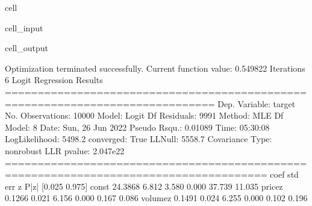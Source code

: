 \documentclass[letterpaper,10pt,english]{jupyterBook}
\begin{document}
\begin{sphinxuseclass}{cell}
\begin{sphinxVerbatimInput}
\begin{sphinxuseclass}{cell_input}
\end{sphinxuseclass}\end{sphinxVerbatimInput}
\begin{sphinxVerbatimOutput}

\begin{sphinxuseclass}{cell_output}
\begin{sphinxVerbatim}[commandchars=\\\{\}]
Optimization terminated successfully.
         Current function value: 0.549822
         Iterations 6
                           Logit Regression Results                           
==============================================================================
Dep. Variable:                 target   No. Observations:                10000
Model:                          Logit   Df Residuals:                     9991
Method:                           MLE   Df Model:                            8
Date:                Sun, 26 Jun 2022   Pseudo R\PYGZhy{}squ.:                 0.01089
Time:                        05:30:08   Log\PYGZhy{}Likelihood:                \PYGZhy{}5498.2
converged:                       True   LL\PYGZhy{}Null:                       \PYGZhy{}5558.7
Covariance Type:            nonrobust   LLR p\PYGZhy{}value:                 2.047e\PYGZhy{}22
======================================================================================
                         coef    std err          z      P\PYGZgt{}|z|      [0.025      0.975]
\PYGZhy{}\PYGZhy{}\PYGZhy{}\PYGZhy{}\PYGZhy{}\PYGZhy{}\PYGZhy{}\PYGZhy{}\PYGZhy{}\PYGZhy{}\PYGZhy{}\PYGZhy{}\PYGZhy{}\PYGZhy{}\PYGZhy{}\PYGZhy{}\PYGZhy{}\PYGZhy{}\PYGZhy{}\PYGZhy{}\PYGZhy{}\PYGZhy{}\PYGZhy{}\PYGZhy{}\PYGZhy{}\PYGZhy{}\PYGZhy{}\PYGZhy{}\PYGZhy{}\PYGZhy{}\PYGZhy{}\PYGZhy{}\PYGZhy{}\PYGZhy{}\PYGZhy{}\PYGZhy{}\PYGZhy{}\PYGZhy{}\PYGZhy{}\PYGZhy{}\PYGZhy{}\PYGZhy{}\PYGZhy{}\PYGZhy{}\PYGZhy{}\PYGZhy{}\PYGZhy{}\PYGZhy{}\PYGZhy{}\PYGZhy{}\PYGZhy{}\PYGZhy{}\PYGZhy{}\PYGZhy{}\PYGZhy{}\PYGZhy{}\PYGZhy{}\PYGZhy{}\PYGZhy{}\PYGZhy{}\PYGZhy{}\PYGZhy{}\PYGZhy{}\PYGZhy{}\PYGZhy{}\PYGZhy{}\PYGZhy{}\PYGZhy{}\PYGZhy{}\PYGZhy{}\PYGZhy{}\PYGZhy{}\PYGZhy{}\PYGZhy{}\PYGZhy{}\PYGZhy{}\PYGZhy{}\PYGZhy{}\PYGZhy{}\PYGZhy{}\PYGZhy{}\PYGZhy{}\PYGZhy{}\PYGZhy{}\PYGZhy{}\PYGZhy{}
const                \PYGZhy{}24.3868      6.812     \PYGZhy{}3.580      0.000     \PYGZhy{}37.739     \PYGZhy{}11.035
price\PYGZus{}z               \PYGZhy{}0.1266      0.021     \PYGZhy{}6.156      0.000      \PYGZhy{}0.167      \PYGZhy{}0.086
volume\PYGZus{}z               0.1491      0.024      6.255      0.000       0.102       0.196

\end{sphinxVerbatim}
\end{sphinxuseclass}
\end{sphinxVerbatimOutput}
\end{sphinxuseclass}
\end{document}
